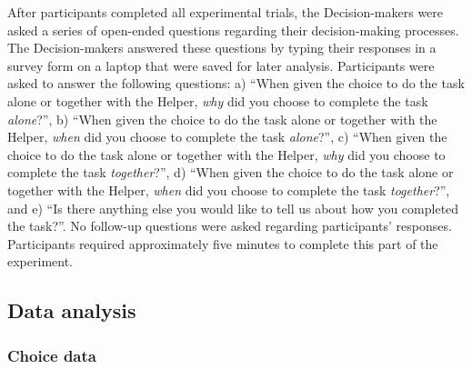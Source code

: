 \documentclass[
  man,
  floatsintext,
  longtable,
  nolmodern,
  notxfonts,
  notimes,
  colorlinks=true,linkcolor=blue,citecolor=blue,urlcolor=blue]{apa7}
\begin{document}
After participants completed all experimental trials, the
Decision-makers were asked a series of open-ended questions regarding
their decision-making processes. The Decision-makers answered these
questions by typing their responses in a survey form on a laptop that
were saved for later analysis. Participants were asked to answer the
following questions: a) ``When given the choice to do the task alone or
together with the Helper, \emph{why} did you choose to complete the task
\emph{alone}?'', b) ``When given the choice to do the task alone or
together with the Helper, \emph{when} did you choose to complete the
task \emph{alone}?'', c) ``When given the choice to do the task alone or
together with the Helper, \emph{why} did you choose to complete the task
\emph{together}?'', d) ``When given the choice to do the task alone or
together with the Helper, \emph{when} did you choose to complete the
task \emph{together}?'', and e) ``Is there anything else you would like
to tell us about how you completed the task?''. No follow-up questions
were asked regarding participants' responses. Participants required
approximately five minutes to complete this part of the experiment.

\subsection{Data analysis}\label{data-analysis}

\subsubsection{Choice data}\label{choice-data}
\end{document}
